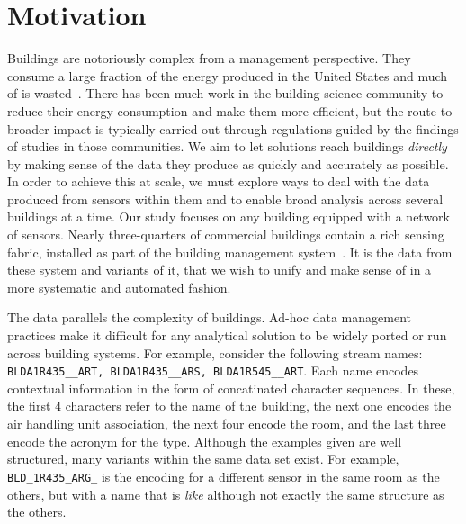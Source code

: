 \section{Motivation}
\label{sec:motivation}

Buildings are notoriously complex from a management perspective.  They consume a large fraction
of the energy produced in the United States and much of is wasted~\cite{next10_waste}.  
There has been
much work in the building science community to reduce their energy consumption and make them more
efficient, but the route to broader impact is typically carried out through regulations guided
by the findings of studies in those communities.%
We aim to let solutions reach buildings \emph{directly} by making sense of the data they produce
as quickly and accurately as possible.
In order to achieve this at scale, we must explore ways to deal with the data produced
from sensors within them and to enable broad analysis across several buildings at a time. Our study
focuses on any building equipped with a network of sensors.  Nearly 
three-quarters of commercial buildings contain a rich sensing fabric, installed as part
of the building management system~\cite{epa}.  
It is the data from these system and variants of it, that
we wish to unify and make sense of in a more systematic and automated fashion.

%
The data parallels the complexity of buildings. Ad-hoc data management practices
make it difficult for any analytical solution to be widely ported or run across building
systems.  For example, consider the following stream names: \texttt{BLDA1R435\_\_ART,
BLDA1R435\_\_ARS, BLDA1R545\_\_ART}. Each name encodes contextual information in the form
of concatinated character sequences. In these, the first 4 characters refer to the 
name of the building, the next one encodes the air handling unit association, the next 
four encode the room,
and the last three encode the acronym for the type.  Although the examples given are well
structured, many variants within the same data set exist.  For example, \texttt{BLD\_1R435\_ARG\_}
is the encoding for a different sensor in the same room as the others, but with a name
that is \emph{like} although not exactly the same structure as the others.

